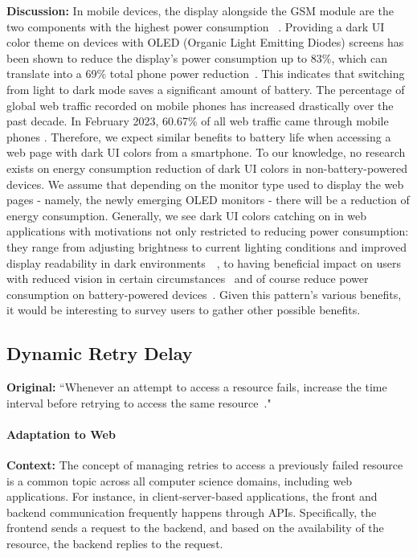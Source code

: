 \textbf{Discussion:} In mobile devices, the display alongside the GSM module are the two components with the highest power consumption ~\cite{Carroll2010}. Providing a dark UI color theme on devices with OLED (Organic Light Emitting Diodes) screens has been shown to reduce the display's power consumption up to 83\%, which can translate into a 69\% total phone power reduction~\cite{Dash2021}. This indicates that switching from light to dark mode saves a significant amount of battery.
The percentage of global web traffic recorded on mobile phones has increased drastically over the past decade. In February 2023, 60.67\% of all web traffic came through mobile phones \cite{statista}. Therefore, we expect similar benefits to battery life when accessing a web page with dark UI colors from a smartphone. To our knowledge, no research exists on energy consumption reduction of dark UI colors in non-battery-powered devices. We assume that depending on the monitor type used to display the web pages - namely, the newly emerging OLED monitors - there will be a reduction of energy consumption. Generally, we see dark UI colors catching on in web applications with motivations not only restricted to reducing power consumption: they range from adjusting brightness to current lighting conditions and improved display readability in dark environments~\cite{Mantiuk2009}~\cite{Rempel2012}, to having beneficial impact on users with reduced vision in certain circumstances~\cite{Bangor1999} and of course reduce power consumption on battery-powered devices~\cite{Dong2009}. Given this pattern's various benefits, it would be interesting to survey users to gather other possible benefits.

\subsection{Dynamic Retry Delay}\label{sec:patterns-DynamicRetryDelay}
\textbf{Original:} ``Whenever an attempt to access a resource fails, increase the time interval before retrying to access the same resource~\cite{cruz2019catalog}."

\paragraph{Adaptation to Web}\mbox{}

\textbf{Context:} The concept of managing retries to access a previously failed resource is a common topic across all computer science domains, including web applications. For instance, in client-server-based applications, the front and backend communication frequently happens through APIs. Specifically, the frontend sends a request to the backend, and based on the availability of the resource, the backend replies to the request.

